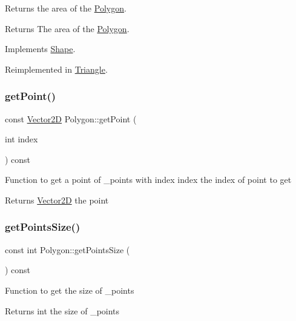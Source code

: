 Returns the area of the \hyperlink{class_polygon}{Polygon}. \begin{DoxyReturn}{Returns}
The area of the \hyperlink{class_polygon}{Polygon}. 
\end{DoxyReturn}


Implements \hyperlink{class_shape_ad9454ee04617290547e7529180b1beae}{Shape}.



Reimplemented in \hyperlink{class_triangle_a5f7fa9fd678345063e50e3458d943a9b}{Triangle}.

\hypertarget{class_polygon_ae488fc076f6a3ca6b36ae6217b38195d}{}\label{class_polygon_ae488fc076f6a3ca6b36ae6217b38195d} 
\subsubsection{\texorpdfstring{get\+Point()}{getPoint()}}
{\footnotesize\ttfamily const \hyperlink{class_vector2_d}{Vector2D} Polygon\+::get\+Point (\begin{DoxyParamCaption}\item[{int}]{index }\end{DoxyParamCaption}) const}

Function to get a point of \+\_\+points with index  index the index of point to get \begin{DoxyReturn}{Returns}
\hyperlink{class_vector2_d}{Vector2D} the point 
\end{DoxyReturn}
\hypertarget{class_polygon_a07f0c79bf97308da04c7bce322331cab}{}\label{class_polygon_a07f0c79bf97308da04c7bce322331cab} 
\subsubsection{\texorpdfstring{get\+Points\+Size()}{getPointsSize()}}
{\footnotesize\ttfamily const int Polygon\+::get\+Points\+Size (\begin{DoxyParamCaption}{ }\end{DoxyParamCaption}) const}

Function to get the size of \+\_\+points \begin{DoxyReturn}{Returns}
int the size of \+\_\+points 
\end{DoxyReturn}
\hypertarget{class_polygon_a2b77c7ecbe9ca68664d7f7020181b791}{}\label{class_polygon_a2b77c7ecbe9ca68664d7f7020181b791} 
